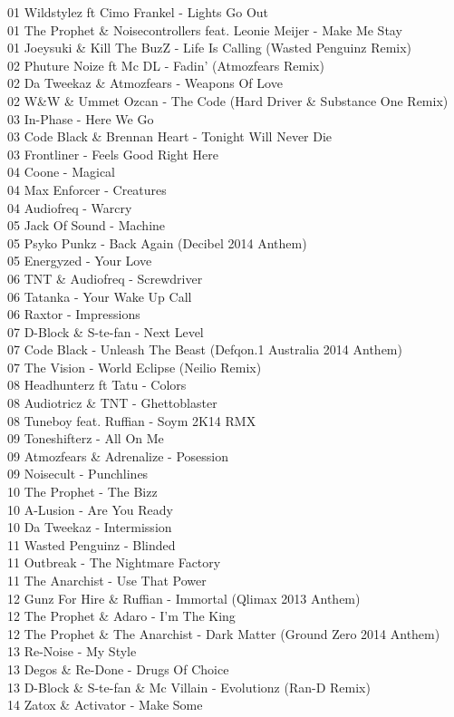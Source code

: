 \begin{multicols}{2}
 01 Wildstylez ft Cimo Frankel - Lights Go Out\\ 01 The Prophet \& Noisecontrollers feat. Leonie Meijer - Make Me Stay\\ 01 Joeysuki \& Kill The BuzZ - Life Is Calling (Wasted Penguinz Remix)\\ 02 Phuture Noize ft Mc DL - Fadin' (Atmozfears Remix)\\ 02 Da Tweekaz \& Atmozfears - Weapons Of Love\\ 02 W\&W \& Ummet Ozcan - The Code (Hard Driver \& Substance One Remix)\\ 03 In-Phase - Here We Go\\ 03 Code Black \& Brennan Heart - Tonight Will Never Die\\ 03 Frontliner - Feels Good Right Here\\ 04 Coone - Magical\\ 04 Max Enforcer - Creatures\\ 04 Audiofreq - Warcry\\ 05 Jack Of Sound - Machine\\ 05 Psyko Punkz - Back Again (Decibel 2014 Anthem)\\ 05 Energyzed - Your Love\\ 06 TNT \& Audiofreq - Screwdriver\\ 06 Tatanka - Your Wake Up Call\\ 06 Raxtor - Impressions\\ 07 D-Block \& S-te-fan - Next Level\\ 07 Code Black - Unleash The Beast (Defqon.1 Australia 2014 Anthem)\\ 07 The Vision - World Eclipse (Neilio Remix)\\ 08 Headhunterz ft Tatu - Colors\\ 08 Audiotricz \& TNT - Ghettoblaster\\ 08 Tuneboy feat. Ruffian - Soym 2K14 RMX\\ 09 Toneshifterz - All On Me\\ 09 Atmozfears \& Adrenalize - Posession\\ 09 Noisecult - Punchlines\\ 10 The Prophet - The Bizz\\ 10 A-Lusion - Are You Ready\\ 10 Da Tweekaz - Intermission\\ 11 Wasted Penguinz - Blinded\\ 11 Outbreak - The Nightmare Factory\\ 11 The Anarchist - Use That Power\\ 12 Gunz For Hire \& Ruffian - Immortal (Qlimax 2013 Anthem)\\ 12 The Prophet \& Adaro - I'm The King\\ 12 The Prophet \& The Anarchist - Dark Matter (Ground Zero 2014 Anthem)\\ 13 Re-Noise - My Style\\ 13 Degos \& Re-Done - Drugs Of Choice\\ 13 D-Block \& S-te-fan \& Mc Villain - Evolutionz (Ran-D Remix)\\ 14 Zatox \& Activator - Make Some 
\end{multicols}
